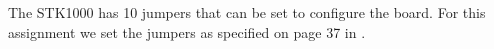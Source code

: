 The STK1000 has 10 jumpers that can be set to configure the board.
For this assignment we set the jumpers as specified on page 37 in \cite{lab-compendium}.
